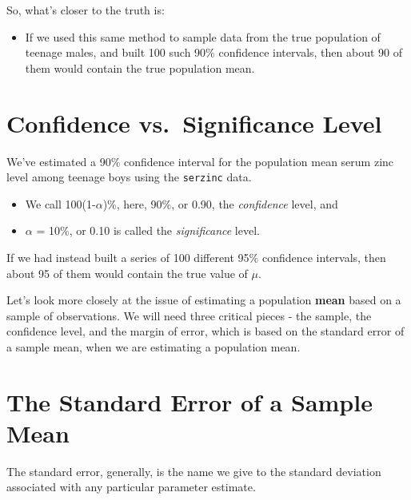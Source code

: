 \documentclass[
]{book}
\providecommand{\tightlist}{%
  \setlength{\itemsep}{0pt}\setlength{\parskip}{0pt}}
\begin{document}
So, what's closer to the truth is:

\begin{itemize}
\tightlist
\item
  If we used this same method to sample data from the true population of teenage males, and built 100 such 90\% confidence intervals, then about 90 of them would contain the true population mean.
\end{itemize}

\hypertarget{confidence-vs.-significance-level}{%
\section{Confidence vs.~Significance Level}\label{confidence-vs.-significance-level}}

We've estimated a 90\% confidence interval for the population mean serum zinc level among teenage boys using the \texttt{serzinc} data.

\begin{itemize}
\tightlist
\item
  We call 100(1-\(\alpha\))\%, here, 90\%, or 0.90, the \emph{confidence} level, and
\item
  \(\alpha\) = 10\%, or 0.10 is called the \emph{significance} level.
\end{itemize}

If we had instead built a series of 100 different 95\% confidence intervals, then about 95 of them would contain the true value of \(\mu\).

Let's look more closely at the issue of estimating a population \textbf{mean} based on a sample of observations. We will need three critical pieces - the sample, the confidence level, and the margin of error, which is based on the standard error of a sample mean, when we are estimating a population mean.

\hypertarget{the-standard-error-of-a-sample-mean}{%
\section{The Standard Error of a Sample Mean}\label{the-standard-error-of-a-sample-mean}}

The standard error, generally, is the name we give to the standard deviation associated with any particular parameter estimate.
\end{document}

